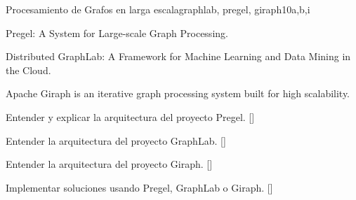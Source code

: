 \begin{syllabus}
\begin{unit}{Procesamiento de Grafos en larga escala}{}{graphlab, pregel, giraph}{10}{a,b,i}
\begin{topics}
    \item Pregel: A System for Large-scale Graph Processing.
    \item Distributed GraphLab: A Framework for Machine Learning and Data Mining in the Cloud.
    \item Apache Giraph is an iterative graph processing system built for high scalability.
\end{topics}
\begin{learningoutcomes}
      \item Entender y explicar la arquitectura del proyecto Pregel. [\Familiarity]
	  \item Entender la arquitectura del proyecto GraphLab. [\Familiarity]
	  \item Entender la arquitectura del proyecto Giraph.  [\Familiarity]
	  \item Implementar soluciones usando Pregel, GraphLab o Giraph. [\Usage]
\end{learningoutcomes}
\end{unit}

\begin{coursebibliography}
\end{coursebibliography}

\end{syllabus}
